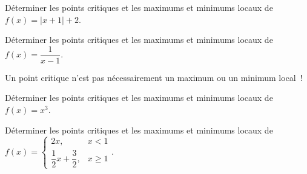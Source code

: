 \documentclass[a4paper,12pt]{article}
\begin{document}
\begin{exemple}
	\tcblower
	Déterminer les points critiques et les maximums et minimums locaux de $f(x)=|x+1|+2$. 
	\vspace{5cm}	
\end{exemple}

\begin{exemple}
	\tcblower
	Déterminer les points critiques et les maximums et minimums locaux de $f(x)=\dfrac{1}{x-1}$. 
	\vspace{5cm}	
\end{exemple}
\begin{remarque}
	\tcblower
	Un point critique n'est pas nécessairement un maximum ou un minimum local~!
\end{remarque}

\begin{exemple}
	\tcblower
	Déterminer les points critiques et les maximums et minimums locaux de $f(x)=x^3$. 
	\vspace{5cm}	
\end{exemple}

\begin{exemple}
	\tcblower
	Déterminer les points critiques et les maximums et minimums locaux de $f(x)=\begin{cases}2x,& x<1\\
	\dfrac{1}{2}x+\dfrac{3}{2},&x\geq 1\end{cases}$. 	
	\vspace{5cm}	
\end{exemple}
\end{document}

